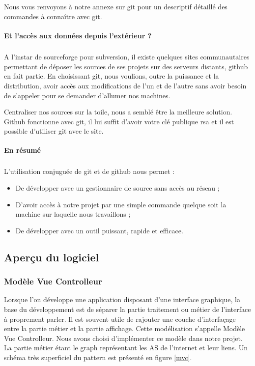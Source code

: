 \subparagraph{}Nous vous renvoyons à notre annexe sur git pour un descriptif détaillé des commandes à connaître avec git.


\paragraph{Et l'accès aux données depuis l'extérieur ?}
\subparagraph{} A l'instar de sourceforge pour subversion, il existe quelques sites communautaires permettant de déposer les sources de ses projets sur des serveurs distants, github en fait partie. En choisissant git, nous voulions, outre la puissance et la distribution, avoir accès aux modifications de l'un et de l'autre sans avoir besoin de s'appeler pour se demander d'allumer nos machines.

Centraliser nos sources sur la toile, nous a semblé être la meilleure solution. Github fonctionne avec git, il lui suffit d'avoir votre clé publique rsa et il est possible d'utiliser git avec le site. 

\paragraph{En résumé}

\subparagraph{}L'utilisation conjuguée de git et de github nous permet :
\begin{itemize}
 \item De développer avec un gestionnaire de source sans accès au réseau ;
 \item D'avoir accès à notre projet par une simple commande quelque soit la machine sur laquelle nous travaillons ;
\item De développer avec un outil puissant, rapide et efficace.
\end{itemize}

\subsection{Aperçu du logiciel}



\subsubsection{Modèle Vue Controlleur}
\label{mvcText}
Lorsque l'on développe une application disposant d'une interface graphique, la base du développement est de séparer la partie traitement ou métier de l'interface à proprement parler. Il est souvent utile de rajouter une couche d'interfaçage entre la partie métier et la partie affichage. Cette modélisation s'appelle Modèle Vue Controlleur. Nous avons choisi d'implémenter ce modèle dans notre projet. La partie métier étant le graph représentant les AS de l'internet et leur liens. Un schéma très superficiel du pattern est présenté en figure \ref{mvc}.

